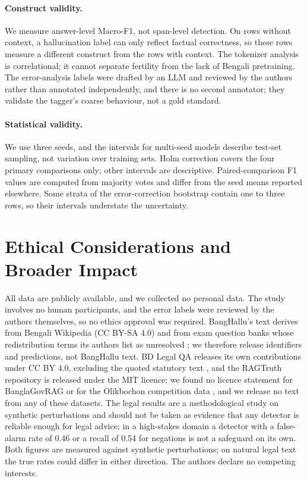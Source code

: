 \documentclass[manuscript,screen,review]{acmart}
\begin{document}
\paragraph{Construct validity.}
We measure answer-level Macro-F1, not span-level detection. On rows without context, a hallucination label can only reflect factual correctness, so these rows measure a different construct from the rows with context. The tokenizer analysis is correlational; it cannot separate fertility from the lack of Bengali pretraining. The error-analysis labels were drafted by an LLM and reviewed by the authors rather than annotated independently, and there is no second annotator; they validate the tagger's coarse behaviour, not a gold standard.

\paragraph{Statistical validity.}
We use three seeds, and the intervals for multi-seed models describe test-set sampling, not variation over training sets. Holm correction covers the four primary comparisons only; other intervals are descriptive. Paired-comparison F1 values are computed from majority votes and differ from the seed means reported elsewhere. Some strata of the error-correction bootstrap contain one to three rows, so their intervals understate the uncertainty.

\section{Ethical Considerations and Broader Impact}\label{sec:ethics}
All data are publicly available, and we collected no personal data. The study involves no human participants, and the error labels were reviewed by the authors themselves, so no ethics approval was required. BangHallu's text derives from Bengali Wikipedia (CC BY-SA 4.0) and from exam question banks whose redistribution terms its authors list as unresolved \cite{banghalluRepo}; we therefore release identifiers and predictions, not BangHallu text. BD Legal QA releases its own contributions under CC BY 4.0, excluding the quoted statutory text \cite{bdlegalqaRepo}, and the RAGTruth repository is released under the MIT licence; we found no licence statement for BanglaGovRAG \cite{banglagovragRepo} or for the Olikbochon competition data \cite{olikbochonKaggle}, and we release no text from any of these datasets. The legal results are a methodological study on synthetic perturbations and should not be taken as evidence that any detector is reliable enough for legal advice; in a high-stakes domain a detector with a false-alarm rate of 0.46 or a recall of 0.54 for negations is not a safeguard on its own. Both figures are measured against synthetic perturbations; on natural legal text the true rates could differ in either direction. The authors declare no competing interests.
\end{document}
